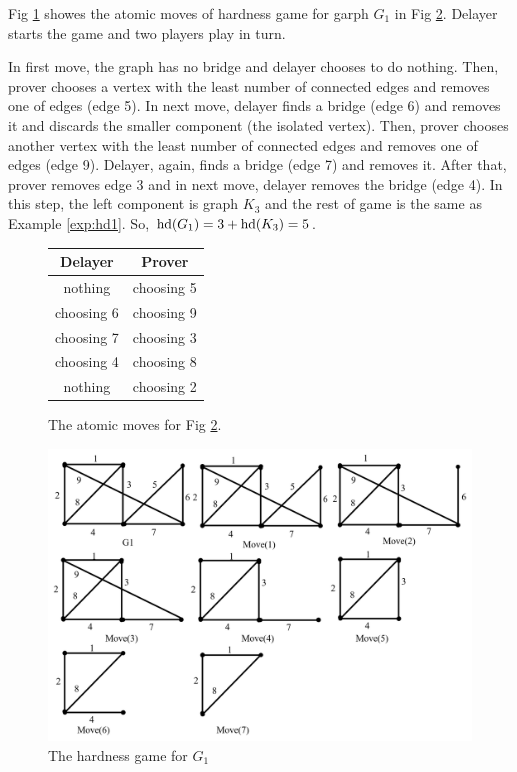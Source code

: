 \documentclass[12pt]{book}
\begin{document}
\begin{examp}\label{exp:hd4}
       Fig \ref{fig:game4} showes the atomic moves of hardness game for garph $G_1$ in Fig \ref{fig:hd4}. Delayer starts the game and two 
	   players play in turn. 
	   
	   In first move, the graph has no bridge and delayer chooses to do nothing. Then, prover chooses a vertex with the least number of 
	   connected edges and removes one of edges (edge 5). In next move, delayer finds a bridge (edge 6) and removes it and discards the 
	   smaller component (the isolated vertex). Then, prover chooses another vertex with the least number of connected edges and removes 
	   one of edges (edge 9). Delayer, again, finds a bridge (edge 7) and removes it. After that, prover removes edge 3 and in next move, 
	   delayer removes the bridge (edge 4). In this step, the left component is graph $K_3$ and the rest of game is the same as Example 
	   \ref{exp:hd1}. So, $\operatorname{hd}(G_1)=3+\operatorname{hd}(K_3)=5$.
	 
	   \begin{figure}[h]
       \centering
       \begin{tabular}{|c|c|} 
       \hline
                  Delayer & Prover \\ \hline
                  nothing & choosing 5  \\ \hline
				  choosing 6 & choosing 9  \\ \hline
				  choosing 7 & choosing 3  \\ \hline
				  choosing 4 & choosing 8  \\ \hline
				  nothing & choosing 2  \\ \hline

      \end{tabular}
      \caption{The atomic moves for Fig \ref{fig:hd4}.}
      \label{fig:game4}
      \end{figure}
	  \begin{figure}
      \begin{center}
      \includegraphics[scale =0.57]{graph_hd1.png}
      \caption{The hardness game for  $G_1$}
	  \label{fig:hd4}
      \end{center}
      \end{figure}
\end{examp}
\end{document}

